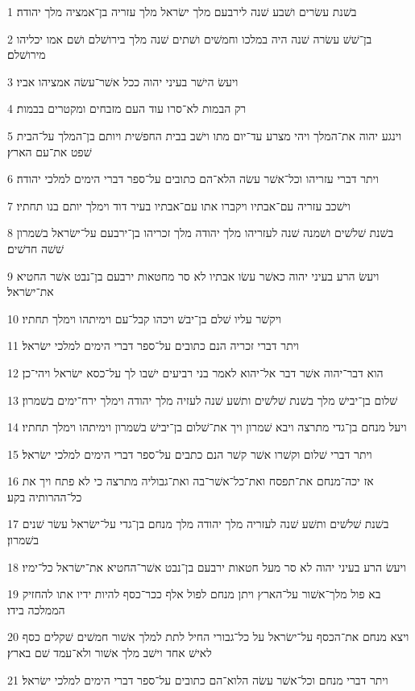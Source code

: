 \par 1 בשׁנת עשׂרים ושׁבע שׁנה לירבעם מלך ישׂראל מלך עזריה בן־אמציה מלך יהודה׃
\par 2 בן־שׁשׁ עשׂרה שׁנה היה במלכו וחמשׁים ושׁתים שׁנה מלך בירושׁלם ושׁם אמו יכליהו מירושׁלם׃
\par 3 ויעשׂ הישׁר בעיני יהוה ככל אשׁר־עשׂה אמציהו אביו׃
\par 4 רק הבמות לא־סרו עוד העם מזבחים ומקטרים בבמות׃
\par 5 וינגע יהוה את־המלך ויהי מצרע עד־יום מתו וישׁב בבית החפשׁית ויותם בן־המלך על־הבית שׁפט את־עם הארץ׃
\par 6 ויתר דברי עזריהו וכל־אשׁר עשׂה הלא־הם כתובים על־ספר דברי הימים למלכי יהודה׃
\par 7 וישׁכב עזריה עם־אבתיו ויקברו אתו עם־אבתיו בעיר דוד וימלך יותם בנו תחתיו׃
\par 8 בשׁנת שׁלשׁים ושׁמנה שׁנה לעזריהו מלך יהודה מלך זכריהו בן־ירבעם על־ישׂראל בשׁמרון שׁשׁה חדשׁים׃
\par 9 ויעשׂ הרע בעיני יהוה כאשׁר עשׂו אבתיו לא סר מחטאות ירבעם בן־נבט אשׁר החטיא את־ישׂראל׃
\par 10 ויקשׁר עליו שׁלם בן־יבשׁ ויכהו קבל־עם וימיתהו וימלך תחתיו׃
\par 11 ויתר דברי זכריה הנם כתובים על־ספר דברי הימים למלכי ישׂראל׃
\par 12 הוא דבר־יהוה אשׁר דבר אל־יהוא לאמר בני רביעים ישׁבו לך על־כסא ישׂראל ויהי־כן׃
\par 13 שׁלום בן־יבישׁ מלך בשׁנת שׁלשׁים ותשׁע שׁנה לעזיה מלך יהודה וימלך ירח־ימים בשׁמרון׃
\par 14 ויעל מנחם בן־גדי מתרצה ויבא שׁמרון ויך את־שׁלום בן־יבישׁ בשׁמרון וימיתהו וימלך תחתיו׃
\par 15 ויתר דברי שׁלום וקשׁרו אשׁר קשׁר הנם כתבים על־ספר דברי הימים למלכי ישׂראל׃
\par 16 אז יכה־מנחם את־תפסח ואת־כל־אשׁר־בה ואת־גבוליה מתרצה כי לא פתח ויך את כל־ההרותיה בקע׃
\par 17 בשׁנת שׁלשׁים ותשׁע שׁנה לעזריה מלך יהודה מלך מנחם בן־גדי על־ישׂראל עשׂר שׁנים בשׁמרון׃
\par 18 ויעשׂ הרע בעיני יהוה לא סר מעל חטאות ירבעם בן־נבט אשׁר־החטיא את־ישׂראל כל־ימיו׃
\par 19 בא פול מלך־אשׁור על־הארץ ויתן מנחם לפול אלף ככר־כסף להיות ידיו אתו להחזיק הממלכה בידו׃
\par 20 ויצא מנחם את־הכסף על־ישׂראל על כל־גבורי החיל לתת למלך אשׁור חמשׁים שׁקלים כסף לאישׁ אחד וישׁב מלך אשׁור ולא־עמד שׁם בארץ׃
\par 21 ויתר דברי מנחם וכל־אשׁר עשׂה הלוא־הם כתובים על־ספר דברי הימים למלכי ישׂראל׃
